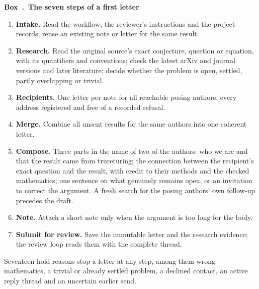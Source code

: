 \documentclass[11pt]{article}
\newcounter{protocolbox}
\newenvironment{protocol}[1]{\refstepcounter{protocolbox}\begin{framed}\noindent\textbf{Box~\theprotocolbox.\ #1}\par\small}{\end{framed}}
\begin{document}
\begin{protocol}{The seven steps of a first letter}
\label{box:outreach}
\begin{enumerate}[leftmargin=*,itemsep=1pt]
\item \textbf{Intake.} Read the workflow, the reviewer's instructions and the
project records; reuse an existing note or letter for the same result.
\item \textbf{Research.} Read the original source's exact conjecture,
question or equation, with its quantifiers and conventions; check the latest
arXiv and journal versions and later literature; decide whether the problem
is open, settled, partly overlapping or trivial.
\item \textbf{Recipients.} One letter per note for all reachable posing
authors, every address registered and free of a recorded refusal.
\item \textbf{Merge.} Combine all unsent results for the same authors into one
coherent letter.
\item \textbf{Compose.} Three parts in the name of two of the authors: who we
are and that the result came from trureturing; the connection between the
recipient's exact question and the result, with credit to their methods and
the checked mathematics; one sentence on what genuinely remains open, or an
invitation to correct the argument. A fresh search for the posing authors'
own follow-up precedes the draft.
\item \textbf{Note.} Attach a short note only when the argument is too long
for the body.
\item \textbf{Submit for review.} Save the immutable letter and the research
evidence; the review loop reads them with the complete thread.
\end{enumerate}
Seventeen hold reasons stop a letter at any step, among them wrong
mathematics, a trivial or already settled problem, a declined contact, an
active reply thread and an uncertain earlier send.
\end{protocol}
\end{document}
